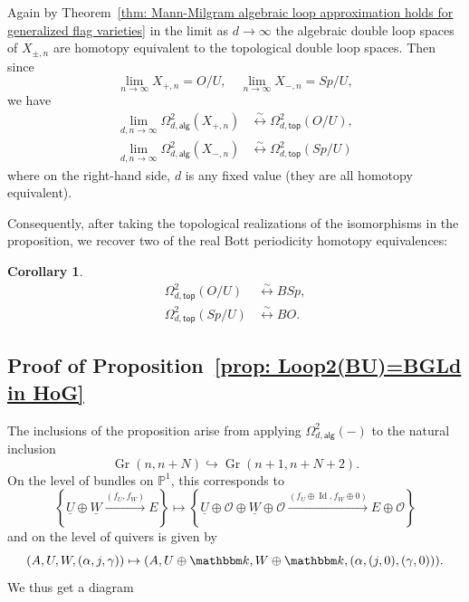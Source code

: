 \documentclass{amsart}
\newtheorem{corollary}[theorem]{Corollary}
\theoremstyle{definition}
\newcommand{\kk} {{\mathbbm k}}
\newcommand{\PP}{\mathbb{P}}
\newcommand{\OO}{\mathcal{O}}
\newcommand{\UL}[1]{\underline{#1}}
\newcommand{\alg}{\mathsf{alg}}
\renewcommand{\top}{\mathsf{top}}
\newcommand{\Gr}{\operatorname{Gr}}
\newcommand{\LoopTwo}{\Omega^{2}_{d,\alg}}
\newcommand{\LoopTwoTop}{\Omega^{2}_{d,\top}}
\newcommand{\Id}{\operatorname{Id}}
\newcommand{\homotopyeq}{\overset \sim \longleftrightarrow}
\begin{document}
Again by Theorem~\ref{thm: Mann-Milgram algebraic loop approximation
holds for generalized flag varieties} in the limit as $d\to \infty$
the algebraic double loop spaces of $X_{\pm,n}$ are homotopy
equivalent to the topological double loop spaces. Then since 
\[
\lim_{n\to \infty}X_{+,n} = O/U, \quad \lim_{n\to \infty}X_{-,n} = Sp/U, 
\]
we have
\begin{align*}
\lim_{d,n\to \infty} \LoopTwo (X_{+,n}) & \homotopyeq \LoopTwoTop (O/U),\\
\lim_{d,n\to \infty} \LoopTwo (X_{-,n}) & \homotopyeq \LoopTwoTop (Sp/U)
\end{align*}
where on the right-hand side, $d$ is any fixed value (they are all
homotopy equivalent).

Consequently, after taking the topological realizations of the
isomorphisms in the proposition, we recover two of the real Bott
periodicity homotopy equivalences:
\begin{corollary}
\begin{align*}
\LoopTwoTop (O/U)& \homotopyeq BSp,\\
\LoopTwoTop (Sp/U)& \homotopyeq BO.
\end{align*}
\end{corollary}

\subsection{Proof of Proposition~\ref{prop: Loop2(BU)=BGLd in HoG}}

The inclusions 
of the proposition arise from applying $\LoopTwo (-)$ to
the natural inclusion
\[
\Gr (n,n+N)\hookrightarrow \Gr (n+1,n+N+2). 
\]
On the level of bundles on $\PP^{1}$, this corresponds to 
\[
\left\{\UL{U}\oplus \UL{W} \xrightarrow{(f_{U},f_{W})}E
\right\}\mapsto \left\{\UL{U}\oplus \OO \oplus \UL{W}\oplus \OO
\xrightarrow{(f_{U}\oplus \Id ,f_{W}\oplus 0)}E\oplus \OO
\right\}
\]
and on the level of quivers is given by
\[
(A,U,W,(\alpha ,j,\gamma ))\mapsto (A,U\oplus \kk ,W\oplus \kk ,(\alpha ,(j,0),(\gamma ,0))).
\]
We thus get a diagram
\end{document}
